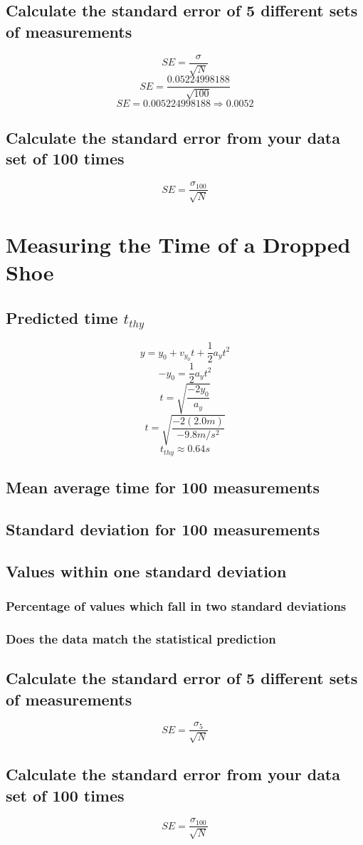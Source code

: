 \documentclass[11pt, letterpaper, includehead]{article}
\begin{document}
\subsection{Calculate the standard error of 5 different sets of measurements}

$$SE = \frac{\sigma}{\sqrt{N}}$$
$$SE = \frac{0.05224998188}{\sqrt{100}}$$
$$SE = 0.005224998188 \Rightarrow \boxed{0.0052}$$

\subsection{Calculate the standard error from your data set of 100 times}

$$SE = \frac{\sigma_{100}}{\sqrt{N}}$$\pagebreak


\section{Measuring the Time of a Dropped Shoe}

\subsection{Predicted time $t_{thy}$} %
$$y       = y_0 + v_{y_0}t + \frac{1}{2}a_yt^2$$
$$-y_0    = \frac{1}{2}a_yt^2$$
$$t       = \sqrt{\frac{-2y_0}{a_y}}$$
$$t       = \sqrt{\frac{-2(2.0m)}{-9.8m/s^2}}$$
$$\boxed{t_{thy}\approx 0.64s}$$

\setcounter{subsection}{3} %
\subsection{Mean average time for 100 measurements} %

\subsection{Standard deviation for 100 measurements} %

\subsection{Values within one standard deviation} %

\subsubsection{Percentage of values which fall in two standard deviations}

\subsubsection{Does the data match the statistical prediction}

\subsection{Calculate the standard error of 5 different sets of measurements}

$$SE = \frac{\sigma_{5}}{\sqrt{N}}$$


\subsection{Calculate the standard error from your data set of 100 times}


$$SE = \frac{\sigma_{100}}{\sqrt{N}}$$
\end{document}
